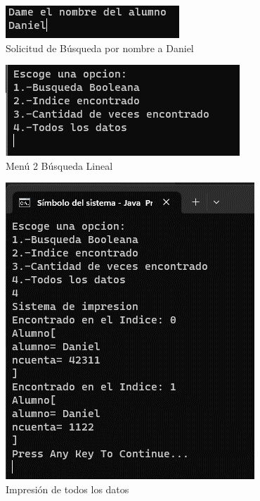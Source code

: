 \documentclass{report}
\begin{document}
\begin{figure}
    \centering
    \includegraphics[width=1\linewidth]{Imagen18.png}
    \caption{Solicitud de Búsqueda por nombre a Daniel}
    
\end{figure}
\begin{figure}
    \centering
    \includegraphics[width=1\linewidth]{Imagen19.png}
    \caption{Menú 2 Búsqueda Lineal}
    
\end{figure}
\begin{figure}
    \centering
    \includegraphics[width=1\linewidth]{Imagen20.png}
    \caption{Impresión de todos los datos}
    
\end{figure}
\end{document}
